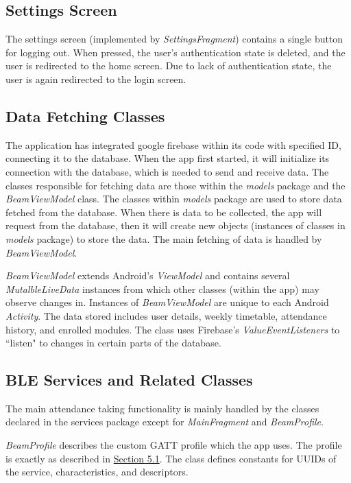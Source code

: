 \documentclass[../report.tex]{subfiles}
\begin{document}
\subsection{Settings Screen}



The settings screen (implemented by \textit{SettingsFragment}) contains a single button for logging out. When pressed, the user’s authentication state is deleted, and the user is redirected to the home screen. Due to lack of authentication state, the user is again redirected to the login screen.

\bigskip
\subsection{Data Fetching Classes}
The application has integrated google firebase within its code with specified ID, connecting it to the database. When the app first started, it will initialize its connection with the database, which is needed to send and receive data. The classes responsible for fetching data are those within the \textit{models} package and the \textit{BeamViewModel} class. The classes within \textit{models} package are used to store data fetched from the database. When there is data to be collected, the app will request from the database, then it will create new objects (instances of classes in \textit{models} package) to store the data. The main fetching of data is handled by \textit{BeamViewModel}.

\textit{BeamViewModel} extends Android’s \textit{ViewModel} and contains several \textit{MutalbleLiveData} instances from which other classes (within the app) may observe changes in. Instances of \textit{BeamViewModel} are unique to each Android \textit{Activity}. The data stored includes user details, weekly timetable, attendance history, and enrolled modules. The class uses Firebase’s \textit{ValueEventListeners} to ``listen" to changes in certain parts of the database. 

\subsection{BLE Services and Related Classes}
The main attendance taking functionality is mainly handled by the classes declared in the services package except for \textit{MainFragment} and \textit{BeamProfile}.

\textit{BeamProfile} describes the custom GATT profile which the app uses. The profile is exactly as described in \hyperref[sec:gatt-profile]{Section 5.1}. The class defines constants for UUIDs of the service, characteristics, and descriptors.
\end{document}
